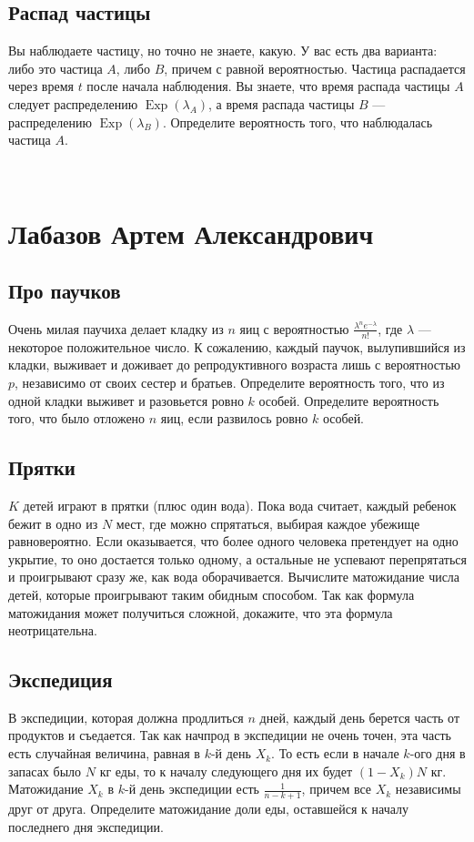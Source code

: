 \documentclass[12pt]{article}
\DeclareMathOperator{\Exp}{Exp}
\begin{document}
\subsection{Распад частицы}
Вы наблюдаете частицу, но точно не знаете, какую. У вас есть два варианта: либо это частица $A$, либо $B$, причем с равной вероятностью. Частица распадается через время $t$ после начала наблюдения. Вы знаете, что время распада частицы $A$ следует распределению $\Exp(\lambda_A)$, а время распада частицы $B$ --- распределению $\Exp(\lambda_B)$. Определите вероятность того, что наблюдалась частица $A$.

\newpage
~
\newpage
\section{Лабазов Артем Александрович}

\subsection{Про паучков}
Очень милая паучиха делает кладку из $n$ яиц с вероятностью $\frac{\lambda^n e^{-\lambda}}{n!}$, где $\lambda$ --- некоторое положительное число. К сожалению, каждый паучок, вылупившийся из кладки, выживает и доживает до репродуктивного возраста лишь с вероятностью $p$, независимо от своих сестер и братьев. Определите вероятность того, что из одной кладки выживет и разовьется ровно $k$ особей. Определите вероятность того, что было отложено $n$ яиц, если развилось ровно $k$ особей.

\subsection{Прятки}
$K$ детей играют в прятки (плюс один вода). Пока вода считает, каждый ребенок бежит в одно из $N$ мест, где можно спрятаться, выбирая каждое убежище равновероятно. Если оказывается, что более одного человека претендует на одно укрытие, то оно достается только одному, а остальные не успевают перепрятаться и проигрывают сразу же, как вода оборачивается. Вычислите матожидание числа детей, которые проигрывают таким обидным способом. Так как формула матожидания может получиться сложной, докажите, что эта формула неотрицательна.

\subsection{Экспедиция}
В экспедиции, которая должна продлиться $n$ дней, каждый день берется часть от продуктов и съедается. Так как начпрод в экспедиции не очень точен, эта часть есть случайная величина, равная в $k$-й день $X_k$. То есть если в начале $k$-ого дня в запасах было $N$ кг еды, то к началу следующего дня их будет $(1 - X_k)N$ кг. Матожидание $X_k$ в $k$-й день экспедиции есть $\frac{1}{n - k + 1}$, причем все $X_k$ независимы друг от друга. Определите матожидание доли еды, оставшейся к началу последнего дня экспедиции.
\end{document}
